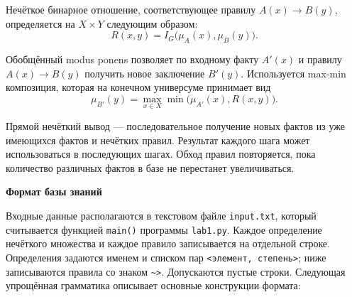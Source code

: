 \documentclass[14pt,a4paper]{extarticle}
\newcommand{\reportheading}[1]{\par\vspace{0.8\baselineskip}\noindent\textbf{#1}\par\nobreak\vspace{0.35\baselineskip}\nobreak}
\begin{document}
Нечёткое бинарное отношение, соответствующее правилу $A(x)\to B(y)$, определяется на $X\times Y$ следующим образом:
\begin{equation}
 R(x,y)=I_G\bigl(\mu_A(x),\mu_B(y)\bigr).
 \label{eq:relation}
\end{equation}

Обобщённый modus ponens позволяет по входному факту $A'(x)$ и правилу $A(x)\to B(y)$ получить новое заключение $B'(y)$. Используется max-min композиция, которая на конечном универсуме принимает вид
\begin{equation}
 \boxed{\mu_{B'}(y)=\max_{x\in X}\min\bigl(\mu_{A'}(x),R(x,y)\bigr).}
 \label{eq:composition}
\end{equation}

Прямой нечёткий вывод --- последовательное получение новых фактов из уже имеющихся фактов и нечётких правил. Результат каждого шага может использоваться в последующих шагах. Обход правил повторяется, пока количество различных фактов в базе не перестанет увеличиваться.

\clearpage
\reportheading{Формат базы знаний}
Входные данные располагаются в текстовом файле \texttt{input.txt}, который считывается функцией \texttt{main()} программы \texttt{lab1.py}. Каждое определение нечёткого множества и каждое правило записывается на отдельной строке. Определения задаются именем и списком пар \texttt{<элемент, степень>}; ниже записываются правила со знаком \texttt{\textasciitilde>}. Допускаются пустые строки. Следующая упрощённая грамматика описывает основные конструкции формата:
\end{document}
